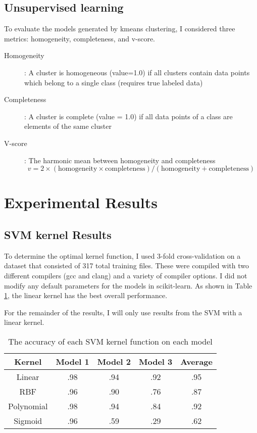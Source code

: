 \subsection{Unsupervised learning}
To evaluate the models generated by kmeans clustering, I considered three metrics: homogeneity, completeness, and v-score.

\begin{description}
	\item[Homogeneity]: A cluster is homogeneous (value=1.0) if all clusters contain data points which belong to a single class (requires true labeled data)
	\item[Completeness]: A cluster is complete (value = 1.0) if all data points of a class are elements of the same cluster
	\item[V-score]: The harmonic mean between homogeneity and completeness $$v=2\times(\text{homogeneity}\times\text{completeness})/ (\text{homogeneity}+\text{completeness})$$
\end{description}

\section{Experimental Results}
\subsection{SVM kernel Results}
To determine the optimal kernel function, I used 3-fold cross-validation on a dataset that consisted of 317 total training files.  These were compiled with two different compilers (gcc and clang) and a variety of compiler options.  I did not modify any default parameters for the models in scikit-learn.  As shown in Table \ref{table:kernelfunction}, the linear kernel has the best overall performance.  

For the remainder of the results, I will only use results from the SVM with a linear kernel.

\begin{center}
\begin{table}[H]
\begin{tabular}{c|cccc}
\textbf{Kernel} & \textbf{Model 1} & \textbf{Model 2} & \textbf{Model 3} & \textbf{Average}\\
\hline
Linear & .98 &.94 & .92 & .95\\
RBF & .96 & .90 & .76 & .87\\
Polynomial & .98 & .94 & .84 & .92\\
Sigmoid & .96 & .59 & .29 & .62
\end{tabular}
\caption{The accuracy of each SVM kernel function on each model}
\label{table:kernelfunction}
\end{table}
\end{center}


